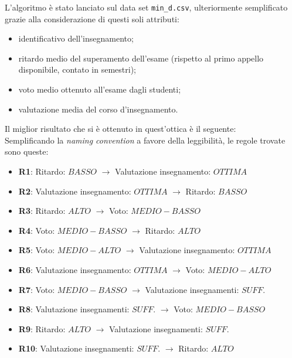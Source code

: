             L'algoritmo è stato lanciato sul data set \texttt{min\_d.csv}, ulteriormente semplificato grazie alla considerazione di questi soli attributi:

            \begin{itemize}
                \item identificativo dell'insegnamento;
                \item ritardo medio del superamento dell'esame (rispetto al primo appello disponibile, contato in semestri);
                \item voto medio ottenuto all'esame dagli studenti;
                \item valutazione media del corso d'insegnamento.
            \end{itemize}

            Il miglior risultato che si è ottenuto in quest'ottica è il seguente: \\

            


            Semplificando la \textit{naming convention} a favore della leggibilità, le regole trovate sono queste:

            \begin{itemize}
                \item \textbf{R1}: Ritardo: $BASSO$ $\rightarrow$ Valutazione insegnamento: $OTTIMA$
                \item \textbf{R2}: Valutazione insegnamento: $OTTIMA$ $\rightarrow$ Ritardo: $BASSO$
                \item \textbf{R3}: Ritardo: $ALTO$ $\rightarrow$ Voto: $MEDIO-BASSO$
                \item \textbf{R4}: Voto: $MEDIO-BASSO$ $\rightarrow$ Ritardo: $ALTO$
                \item \textbf{R5}: Voto: $MEDIO-ALTO$ $\rightarrow$ Valutazione insegnamento: $OTTIMA$
                \item \textbf{R6}: Valutazione insegnamento: $OTTIMA$ $\rightarrow$ Voto: $MEDIO-ALTO$
                \item \textbf{R7}: Voto: $MEDIO-BASSO$ $\rightarrow$ Valutazione insegnamenti: $SUFF.$
                \item \textbf{R8}: Valutazione insegnamenti: $SUFF.$ $\rightarrow$ Voto: $MEDIO-BASSO$
                \item \textbf{R9}: Ritardo: $ALTO$ $\rightarrow$ Valutazione insegnamenti: $SUFF.$
                \item \textbf{R10}: Valutazione insegnamenti: $SUFF.$ $\rightarrow$ Ritardo: $ALTO$
            \end{itemize}

